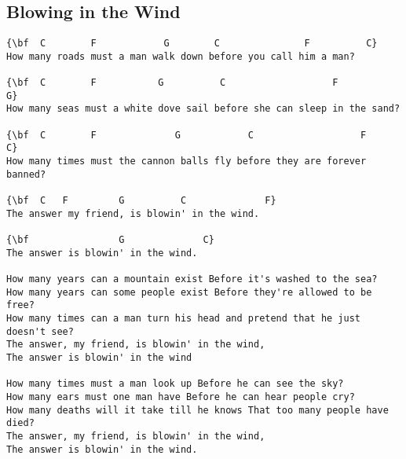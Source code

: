 \documentclass[a4paper]{article}
\begin{document}
\subsection{Blowing in the Wind}
\begin{Verbatim}[commandchars=\\\{\}]
{\bf  C        F            G        C               F          C}
How many roads must a man walk down before you call him a man?

{\bf  C        F           G          C                   F            G}
How many seas must a white dove sail before she can sleep in the sand?

{\bf  C        F              G            C                   F       C}
How many times must the cannon balls fly before they are forever banned?

{\bf  C   F         G          C              F}
The answer my friend, is blowin' in the wind.

{\bf                G              C}
The answer is blowin' in the wind.

How many years can a mountain exist Before it's washed to the sea?
How many years can some people exist Before they're allowed to be free?
How many times can a man turn his head and pretend that he just doesn't see?
The answer, my friend, is blowin' in the wind,
The answer is blowin' in the wind

How many times must a man look up Before he can see the sky?
How many ears must one man have Before he can hear people cry?
How many deaths will it take till he knows That too many people have died?
The answer, my friend, is blowin' in the wind,
The answer is blowin' in the wind.

\end{Verbatim}
\newpage
\end{document}
